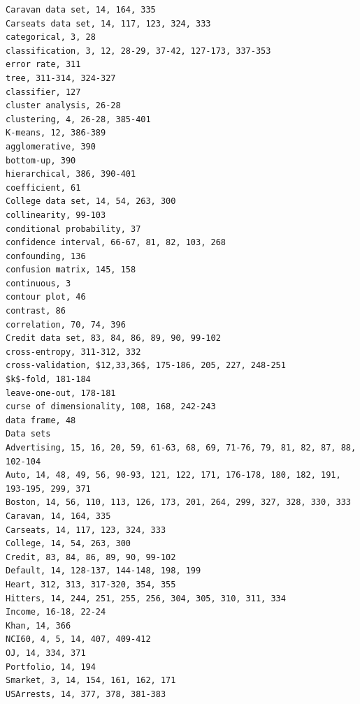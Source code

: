 \documentclass[10pt]{article}
\begin{document}
\begin{verbatim}
Caravan data set, 14, 164, 335
Carseats data set, 14, 117, 123, 324, 333
categorical, 3, 28
classification, 3, 12, 28-29, 37-42, 127-173, 337-353
error rate, 311
tree, 311-314, 324-327
classifier, 127
cluster analysis, 26-28
clustering, 4, 26-28, 385-401
K-means, 12, 386-389
agglomerative, 390
bottom-up, 390
hierarchical, 386, 390-401
coefficient, 61
College data set, 14, 54, 263, 300
collinearity, 99-103
conditional probability, 37
confidence interval, 66-67, 81, 82, 103, 268
confounding, 136
confusion matrix, 145, 158
continuous, 3
contour plot, 46
contrast, 86
correlation, 70, 74, 396
Credit data set, 83, 84, 86, 89, 90, 99-102
cross-entropy, 311-312, 332
cross-validation, $12,33,36$, 175-186, 205, 227, 248-251
$k$-fold, 181-184
leave-one-out, 178-181
curse of dimensionality, 108, 168, 242-243
data frame, 48
Data sets
Advertising, 15, 16, 20, 59, 61-63, 68, 69, 71-76, 79, 81, 82, 87, 88, 102-104
Auto, 14, 48, 49, 56, 90-93, 121, 122, 171, 176-178, 180, 182, 191, 193-195, 299, 371
Boston, 14, 56, 110, 113, 126, 173, 201, 264, 299, 327, 328, 330, 333
Caravan, 14, 164, 335
Carseats, 14, 117, 123, 324, 333
College, 14, 54, 263, 300
Credit, 83, 84, 86, 89, 90, 99-102
Default, 14, 128-137, 144-148, 198, 199
Heart, 312, 313, 317-320, 354, 355
Hitters, 14, 244, 251, 255, 256, 304, 305, 310, 311, 334
Income, 16-18, 22-24
Khan, 14, 366
NCI60, 4, 5, 14, 407, 409-412
OJ, 14, 334, 371
Portfolio, 14, 194
Smarket, 3, 14, 154, 161, 162, 171
USArrests, 14, 377, 378, 381-383


\end{verbatim}
\end{document}
